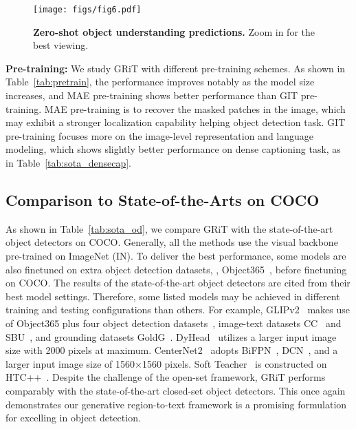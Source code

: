 \documentclass[10pt,twocolumn,letterpaper]{article}
\newcommand{\myparagraph}[1]{{\vspace{0.5em} \noindent \bf #1}}
\begin{document}
\begin{figure*}[t!]
	\vspace{-1mm}
	\centering
	\texttt{[image: figs/fig6.pdf]}
	\vspace{-5mm}
	\caption{\textbf{Zero-shot object understanding predictions.} Zoom in for the best viewing.}
	\vspace{-2mm}
	\label{fig:fig6}
\end{figure*}

\myparagraph{Pre-training:} We study GRiT with different pre-training schemes. As shown in Table~\ref{tab:pretrain}, the performance improves notably as the model size increases, and MAE pre-training shows better performance than GIT pre-training. MAE pre-training is to recover the masked patches in the image, which may exhibit a stronger localization capability helping object detection task. GIT pre-training focuses more on the image-level representation and language modeling, which shows slightly better performance on dense captioning task, as in Table~\ref{tab:sota_densecap}.

\subsection{Comparison to State-of-the-Arts on COCO}
As shown in Table~\ref{tab:sota_od}, we compare GRiT with the state-of-the-art object detectors on COCO. Generally, all the methods use the visual backbone pre-trained on ImageNet (IN). To deliver the best performance, some models are also finetuned on extra object detection datasets, \eg, Object365~\cite{shao2019objects365}, before finetuning on COCO. The results of the state-of-the-art object detectors are cited from their best model settings. Therefore, some listed models may be achieved in different training and testing configurations than others. For example, GLIPv2~\cite{zhang2022glipv2} makes use of Object365 plus four object detection datasets~\cite{zhang2022glipv2}, image-text datasets CC~\cite{sharma2018conceptual} and SBU~\cite{ordonez2011im2text}, and grounding datasets GoldG~\cite{zhang2022glipv2}. DyHead~\cite{dai2021dynamic} utilizes a larger input image size with 2000 pixels at maximum. CenterNet2~\cite{zhou2021probabilistic} adopts BiFPN~\cite{tan2020efficientdet}, DCN~\cite{dai2017deformable}, and a larger input image size of 1560$\times$1560 pixels.  Soft Teacher~\cite{xu2021end} is constructed on HTC++~\cite{liu2021swin}. Despite the challenge of the open-set framework, GRiT performs comparably with the state-of-the-art closed-set object detectors. This once again demonstrates our generative region-to-text framework is a promising formulation for excelling in object detection. 
\end{document}
